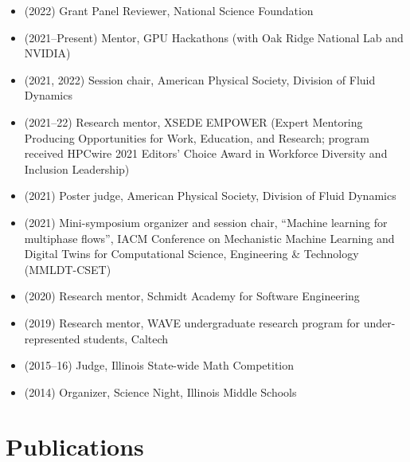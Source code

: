\begin{itemize}
    \item (2022) Grant Panel Reviewer, National Science Foundation
    \item (2021--Present) Mentor, GPU Hackathons (with Oak Ridge National Lab and NVIDIA)
    \item (2021, 2022) Session chair, American Physical Society, Division of Fluid Dynamics
    \item (2021--22) Research mentor, XSEDE EMPOWER (Expert Mentoring Producing Opportunities for Work, Education, and Research; program received HPCwire 2021 Editors' Choice Award in Workforce Diversity and Inclusion Leadership)
    \item (2021) Poster judge, American Physical Society, Division of Fluid Dynamics
    \item (2021) Mini-symposium organizer and session chair, ``Machine learning for multiphase flows'', IACM Conference on Mechanistic Machine Learning and Digital Twins for Computational Science, Engineering \& Technology (MMLDT-CSET)
    \item (2020) Research mentor, Schmidt Academy for Software Engineering
    \item (2019) Research mentor, WAVE undergraduate research program for under-represented students, Caltech
    \item (2015--16) Judge, Illinois State-wide Math Competition
    \item (2014) Organizer, Science Night, Illinois Middle Schools
\end{itemize}

\section{Publications}

\nocite{*}

\newrefcontext[labelprefix=P]
\printbibliography[type=unpublished,title={Preprints},resetnumbers=true,heading=subbibnumbered]

\newrefcontext[labelprefix=J]
\printbibliography[type=article,title={Journal papers},resetnumbers=true,heading=subbibnumbered]

\newrefcontext[labelprefix=C]
\printbibliography[type=inproceedings,title={Refereed conference papers},resetnumbers=true,heading=subbibnumbered]

\newrefcontext[labelprefix=O]
\printbibliography[title={Other publications},resetnumbers=true,filter=other,heading=subbibnumbered]

